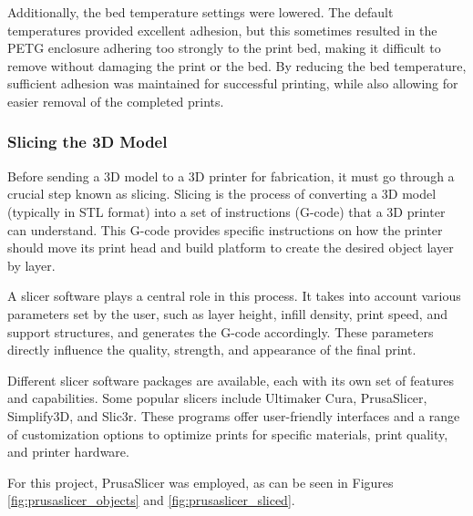 Additionally, the bed temperature settings were lowered. The default temperatures provided 
excellent adhesion, but this sometimes resulted in the PETG enclosure adhering too strongly to the 
print bed, making it difficult to remove without damaging the print or the bed. By reducing the 
bed temperature, sufficient adhesion was maintained for successful printing, while also allowing 
for easier removal of the completed prints.

\subsubsection{Slicing the 3D Model}

Before sending a 3D model to a 3D printer for fabrication, it must go through a crucial step known as slicing. Slicing is the process of converting a 3D model (typically in STL format) into a set of instructions (G-code) that a 3D printer can understand. This G-code provides specific instructions on how the printer should move its print head and build platform to create the desired object layer by layer.

A slicer software plays a central role in this process. It takes into account various parameters set by the user, such as layer height, infill density, print speed, and support structures, and generates the G-code accordingly. These parameters directly influence the quality, strength, and appearance of the final print.

Different slicer software packages are available, each with its own set of features and capabilities. Some popular slicers include Ultimaker Cura, PrusaSlicer, Simplify3D, and Slic3r. These programs offer user-friendly interfaces and a range of customization options to optimize prints for specific materials, print quality, and printer hardware.

For this project, PrusaSlicer was employed, as can be seen in Figures \ref{fig:prusaslicer_objects} and \ref{fig:prusaslicer_sliced}.

